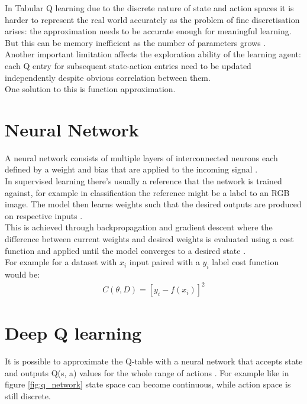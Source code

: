 In Tabular Q learning due to the discrete nature of 
state and action spaces it is harder to represent the real world accurately as the problem of fine discretisation arises: the approximation needs to be accurate enough for meaningful learning. But this can be memory inefficient as the number of parameters grows \cite{lecture_intro_to_deep_rl}. \\

Another important limitation affects the exploration ability of the learning agent: each Q entry for subsequent state-action entries need to be updated independently despite obvious correlation between them.\\

One solution to this is function approximation.

\section{Neural Network}

A neural network consists of multiple layers of interconnected neurons each defined by a weight and bias that are applied to the incoming signal \cite{lecture_intro_to_deep_rl}.\\

In supervised learning there's usually a reference that 
the network is trained against, for example in classification the reference might be a label to an RGB image. The model then learns weights such that the desired outputs are produced on respective inputs \cite{lecture_intro_to_deep_rl} . \\

This is achieved through backpropagation and gradient
descent where the difference between current weights and
desired weights is evaluated using a cost function and
applied until the model converges to a desired state
\cite{lecture_intro_to_deep_rl} .\\

For example for a dataset with $x_i$ input paired with a $y_i$ label cost function would be: 
\begin{align}
    C(\theta, D) = [y_i - f(x_i)]^2
\end{align}

\section{Deep Q learning}

It is possible to approximate the Q-table with a neural network that accepts state and outputs Q(s, a) 
values for the whole range of actions \cite{lecture_intro_to_deep_rl}. For example like in 
figure \ref{fig:q_network} state space can become continuous, while action space is still discrete.

